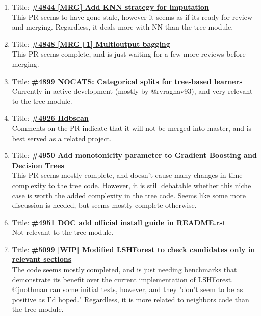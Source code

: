 \documentclass[12pt, oneside]{article}
\begin{document}
\begin{enumerate}
  \item
  Title:
  \textbf{\href{https://github.com/scikit-learn/scikit-learn/pull/4844}
    {\#4844 [MRG] Add KNN strategy for imputation}}\\
  This PR seems to have gone stale, however it seems as if its ready
  for review and merging. Regardless, it deals more with NN than the
  tree module.

  \item
  Title:
  \textbf{\href{https://github.com/scikit-learn/scikit-learn/pull/4848}
    {\#4848 [MRG+1] Multioutput bagging}}\\
  This PR seems complete, and is just waiting for a few more reviews
  before merging.

  \item
  Title:
  \textbf{\href{https://github.com/scikit-learn/scikit-learn/pull/4899}
    {\#4899 NOCATS: Categorical splits for tree-based learners}}\\
  Currently in active development (mostly by @rvraghav93), and very 
  relevant to the tree module.

  \item
  Title:
  \textbf{\href{https://github.com/scikit-learn/scikit-learn/pull/4926}
    {\#4926 Hdbscan}}\\
  Comments on the PR indicate that it will not be merged into master,
  and is best served as a related project.

  \item
  Title:
  \textbf{\href{https://github.com/scikit-learn/scikit-learn/pull/4950}
    {\#4950 Add monotonicity parameter to Gradient Boosting and
      Decision Trees}}\\
  This PR seems mostly complete, and doesn't cause many changes in
  time complexity to the tree code. However, it is still debatable
  whether this niche case is worth the added complexity in the tree
  code. Seems like some more discussion is needed, but seems mostly
  complete otherwise.

  \item
  Title:
  \textbf{\href{https://github.com/scikit-learn/scikit-learn/pull/4951}
    {\#4951 DOC add official install guide in README.rst}}\\
  Not relevant to the tree module.

  \item
  Title:
  \textbf{\href{https://github.com/scikit-learn/scikit-learn/pull/5099}
    {\#5099 [WIP] Modified LSHForest to check candidates only in
      relevant sections}}\\
  The code seems mostly completed, and is just needing benchmarks that
  demonstrate its benefit over the current implementation of
  LSHForest. @jnothman ran some initial tests, however, and they
  "don't seem to be as positive as I'd hoped." Regardless, it is more
  related to neighbors code than the tree module.


\end{enumerate}
\end{document}
